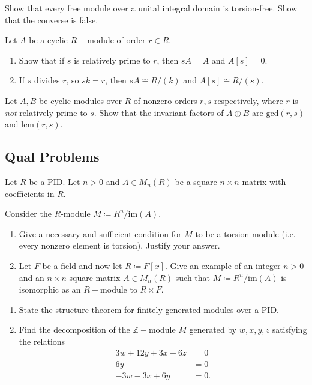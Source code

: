 \begin{problem}[Hungerford 4.6.2]
Show that every free module over a unital integral domain is torsion-free. Show that the converse is false.
\end{problem}

\begin{problem}[Hungerford 4.6.3]
Let $A$ be a cyclic $R-$module of order $r \in R$.
\begin{enumerate}
    \item Show that if $s$ is relatively prime to $r$, then $sA = A$ and $A[s] = 0$.
    \item If $s$ divides $r$, so $sk = r$, then $sA \cong R/(k)$ and $A[s] \cong R/(s)$.
\end{enumerate}
\end{problem}

\begin{problem}[Hungerford 4.6.6]
Let $A, B$ be cyclic modules over $R$ of nonzero orders $r,s$ respectively, where $r$ is \textit{not} relatively prime to $s$. Show that the invariant factors of $A \oplus B$ are $\mathrm{gcd}(r, s)$ and $\mathrm{lcm}(r, s)$.
\end{problem}

\newpage
\subsection{Qual Problems}

\begin{problem}
Let $R$ be a PID. Let $n > 0$ and $A \in M_n(R)$ be a square $n\times n$ matrix with coefficients in $R$.

Consider the $R$-module $M \coloneqq R^n / \mathrm{im}(A)$.

\begin{enumerate}
    \item Give a necessary and sufficient condition for $M$ to be a torsion module (i.e. every nonzero element is torsion).
    Justify your answer.
    
    \item Let $F$ be a field and now let $R \coloneqq F[x]$. Give an example of an integer $n>0$ and an $n \times n$ square matrix $A \in M_n(R)$ such that $M \coloneqq R^n/\mathrm{im}(A)$ is isomorphic as an $R-$module to $R \times F$.
\end{enumerate}
\end{problem}

\begin{problem}
\begin{enumerate}
    \item State the structure theorem for finitely generated modules over a PID.
    \item Find the decomposition of the $\mathbb{Z}-$module $M$ generated by $w,x,y,z$ satisfying the relations
    \begin{align*}
        3w + 12y + 3x + 6z &=0 \\
        6y &= 0 \\
        -3w -3x + 6y &= 0.
    \end{align*}
\end{enumerate}
\end{problem}

